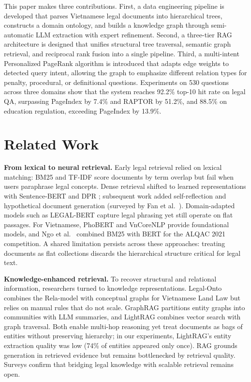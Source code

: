 \documentclass{IOS-Book-Article}
\begin{document}
This paper makes three contributions. First, a data engineering pipeline is developed that parses Vietnamese legal documents into hierarchical trees, constructs a domain ontology, and builds a knowledge graph through semi-automatic LLM extraction with expert refinement. Second, a three-tier RAG architecture is designed that unifies structural tree traversal, semantic graph retrieval, and reciprocal rank fusion into a single pipeline. Third, a multi-intent Personalized PageRank algorithm is introduced that adapts edge weights to detected query intent, allowing the graph to emphasize different relation types for penalty, procedural, or definitional questions. Experiments on 530 questions across three domains show that the system reaches 92.2\% top-10 hit rate on legal QA, surpassing PageIndex by 7.4\% and RAPTOR by 51.2\%, and 88.5\% on education regulation, exceeding PageIndex by 13.9\%.

\section{Related Work}
\label{sec:related}

\textbf{From lexical to neural retrieval.}
Early legal retrieval relied on lexical matching: BM25 \cite{r18} and TF-IDF \cite{r19} score documents by term overlap but fail when users paraphrase legal concepts. Dense retrieval shifted to learned representations with Sentence-BERT \cite{r2} and DPR \cite{r10}; subsequent work added self-reflection \cite{r11} and hypothetical document generation \cite{r13} (surveyed by Fan et al.\ \cite{r4}). Domain-adapted models such as LEGAL-BERT \cite{r20} capture legal phrasing yet still operate on flat passages. For Vietnamese, PhoBERT \cite{r22} and VnCoreNLP \cite{r23} provide foundational models, and Ngo et al.\ \cite{r24} combined BM25 with BERT \cite{r25} for the ALQAC 2021 competition. A shared limitation persists across these approaches: treating documents as flat collections discards the hierarchical structure critical for legal text.

\textbf{Knowledge-enhanced retrieval.}
To recover structural and relational information, researchers turned to knowledge representations. Legal-Onto \cite{r8} combines the Rela-model \cite{r21} with conceptual graphs for Vietnamese Land Law but relies on manual rules that do not scale. GraphRAG \cite{r6} partitions entity graphs into communities with LLM summaries, and LightRAG \cite{r5} combines vector search with graph traversal. Both enable multi-hop reasoning yet treat documents as bags of entities without preserving hierarchy; in our experiments, LightRAG's entity extraction quality was low (74\% of entities appeared only once). RAG \cite{r1} grounds generation in retrieved evidence but remains bottlenecked by retrieval quality. Surveys \cite{r26,r27} confirm that bridging legal knowledge with scalable retrieval remains open.
\end{document}
